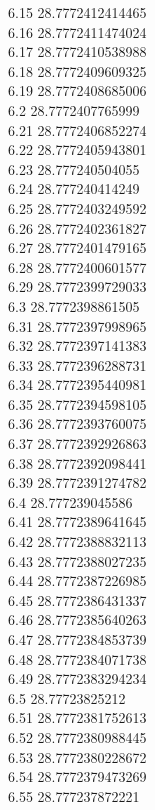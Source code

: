 {6.15	28.7772412414465\\
6.16	28.7772411474024\\
6.17	28.7772410538988\\
6.18	28.7772409609325\\
6.19	28.7772408685006\\
6.2	28.7772407765999\\
6.21	28.7772406852274\\
6.22	28.7772405943801\\
6.23	28.777240504055\\
6.24	28.777240414249\\
6.25	28.7772403249592\\
6.26	28.7772402361827\\
6.27	28.7772401479165\\
6.28	28.7772400601577\\
6.29	28.7772399729033\\
6.3	28.7772398861505\\
6.31	28.7772397998965\\
6.32	28.7772397141383\\
6.33	28.7772396288731\\
6.34	28.7772395440981\\
6.35	28.7772394598105\\
6.36	28.7772393760075\\
6.37	28.7772392926863\\
6.38	28.7772392098441\\
6.39	28.7772391274782\\
6.4	28.777239045586\\
6.41	28.7772389641645\\
6.42	28.7772388832113\\
6.43	28.7772388027235\\
6.44	28.7772387226985\\
6.45	28.7772386431337\\
6.46	28.7772385640263\\
6.47	28.7772384853739\\
6.48	28.7772384071738\\
6.49	28.7772383294234\\
6.5	28.77723825212\\
6.51	28.7772381752613\\
6.52	28.7772380988445\\
6.53	28.7772380228672\\
6.54	28.7772379473269\\
6.55	28.777237872221\\
}
